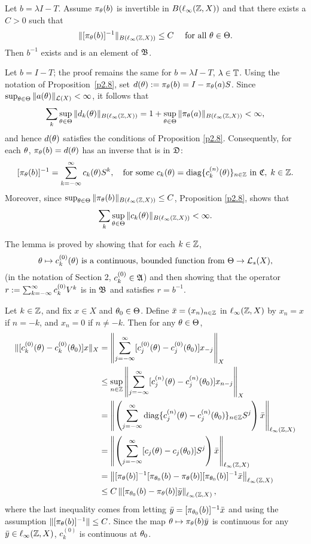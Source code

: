 \begin{lem} Let $b=\lambda I-T$.  Assume $\pi_\theta(b)$ is
invertible in $B(\ell_\infty({\Bbb{Z}},X))$ and that there exists a $C>0$ such that
$$
\|[\pi_\theta(b)]^{-1}\|_{B(\ell_\infty({\Bbb{Z}},X))}\le C\quad\text{ for all } \theta\in \Theta.
$$
Then $b^{-1}$ exists and is an element of ${\frak{B}}$.
\end{lem}

\begin{pf}  Let $b=I-T$; the proof remains the same
for $b=\lambda I-T$, $\lambda\in{\Bbb{T}}$.
Using the notation of Proposition~\ref{p2.8}, set
$d(\theta):=\pi_\theta(b)= I-\pi_\theta(a)S$.
Since $\sup_{\theta\in \Theta} \|a(\theta)\|_{{\cal{L}}(X)}<\infty$,
it follows that \[\sum_k\sup_{\theta\in \Theta}\|d_k(\theta)\|_{B(\ell_\infty({\Bbb{Z}},X))}
=1+\sup_{\theta\in \Theta}\|\pi_\theta(a)\|_{B(\ell_\infty({\Bbb{Z}},X))} < \infty,\] and hence
$d(\theta)$ satisfies the
conditions of Proposition \ref{p2.8}.
Consequently, for each $\theta$, $\pi_\theta(b)=d(\theta)$
has an inverse that is in ${\frak{D}}$:
$$
[\pi_\theta(b)]^{-1}= \sum_{k=-\infty}^\infty c_k(\theta) S^k,
\quad\text{for some } c_k(\theta)=\operatorname{diag}\{c_k^{(n)}(\theta)\}_{n\in{\Bbb{Z}}}
\text{ in }{\frak{C}}, \; k\in{\Bbb{Z}}.$$
Moreover, since $\sup_{\theta\in \Theta}\|\pi_\theta(b)\|_{B(\ell_\infty({\Bbb{Z}},X))}\le C$,
Proposition \ref{p2.8}, shows that
\[\sum_k \sup_{\theta\in \Theta} \|c_k(\theta)\|_{B(\ell_\infty({\Bbb{Z}},X))} < \infty.\]

The lemma is proved by showing that for each $k\in{\Bbb{Z}}$,
\begin{equation}\lb{l4.4-1}
\th  \mapsto c^{(0)}_k(\th)
\text{ is a continuous, bounded function from } \TH\to \calL_s(X),
\end{equation}
(in the notation of Section 2, $c_k^{(0)}\in{\frak{A}}$)
and then showing that the operator $r:=\sum_{k=-\infty}^\infty c_k^{(0)}V^k$
is in ${\frak{B}}$ and satisfies $r=b^{-1}$.

Let $k\in{\Bbb{Z}}$, and fix $x\in X$ and $\theta_0\in \Theta$.
Define $\bar x=(x_n)_{n\in{\Bbb{Z}}}$
in $\ell_\infty({\Bbb{Z}},X)$ by $x_n=x$ if $n=-k$, and $x_n=0$ if $n\ne -k$.
Then for any $\theta\in \Theta$,
$$\begin{aligned}
\|[c^{(0)}_k(\theta)-c^{(0)}_k(\theta_0)]x\|_X
&=\left\|\sum_{j=-\infty}^\infty[c^{(0)}_j(\theta)-c^{(0)}_j(\theta_0)]x_{-j}\right\|_X\\
&\le\sup_{n\in{\Bbb{Z}}}\left\|\sum_{j=-\infty}^\infty
   [c^{(n)}_j(\theta)-c_j^{(n)}(\theta_0)]x_{n-j} \right\|_X \\
&=\left\|\left(\sum_{j=-\infty}^\infty\operatorname{diag}
  \{c^{(n)}_j(\theta)-c_j^{(n)}(\theta_0)\}_{n\in{\Bbb{Z}}}S^j\right)
  \bar x\right\|_{\ell_\infty({\Bbb{Z}},X)}\\
&=\left\|\left(\sum_{j=-\infty}^\infty[c_j(\theta)-c_j(\theta_0)]S^j
  \right)\bar x\right\|_{\ell_\infty({\Bbb{Z}},X)}\\
&=\left\| [\pi_\theta(b)]^{-1}[\pi_{\theta_{0}}(b)-
   \pi_\theta(b)][\pi_{\theta_0}(b)]^{-1}\bar x\right\|_{\ell_\infty({\Bbb{Z}},X)}\\
&\le C\left\|[\pi_{\theta_0}(b)-\pi_\theta(b)]\bar y\right\|_{\ell_\infty({\Bbb{Z}},X)},
\end{aligned}
$$
where the last inequality comes from letting
$\bar y=[\pi_{\theta_0}(b)]^{-1}\bar x$ and using the assumption
$\|[\pi_\theta(b)]^{-1}\|\le C$.  Since the map
$\theta\mapsto \pi_\theta(b)\bar y$ is continuous for any $\bar y\in\ell_\infty({\Bbb{Z}},X)$,
$c_k^{(0)}$ is continuous at $\theta_0$.



\end{pf}
